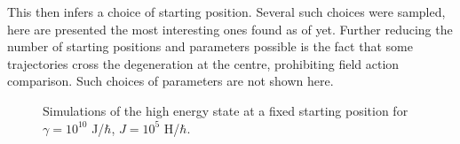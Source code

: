 \documentclass[main.tex]{subfiles}
\begin{document}
This then infers a choice of starting position. Several such choices were sampled, here are
presented the most interesting ones found as of yet. Further reducing the number of
starting positions and parameters possible is the fact that some trajectories cross the
degeneration at the centre, prohibiting field action comparison. Such choices of parameters
are not shown here. 

\begin{figure}[h]
    \centering
    \qquad
    \caption{\centering Simulations of the high energy state at a fixed starting position for \(\gamma
    = 10^{10}\) J/\(\hbar{}\), \(J= 10^{5}\) H/\(\hbar{}\).}%
    \label{fig:n2m-25}
\end{figure}
\end{document}
